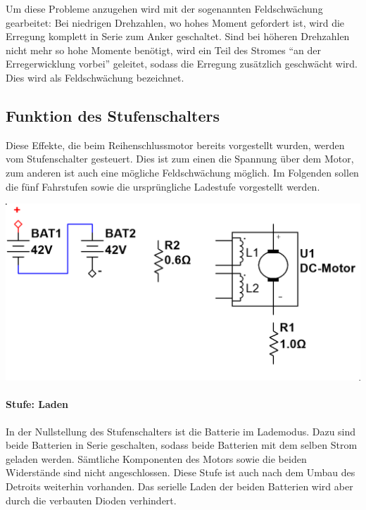 Um diese Probleme anzugehen wird mit der sogenannten Feldschwächung gearbeitet: Bei niedrigen Drehzahlen, wo hohes Moment gefordert ist, wird die Erregung komplett in Serie zum Anker geschaltet. Sind bei höheren Drehzahlen nicht mehr so hohe Momente benötigt, wird ein Teil des Stromes "`an der Erregerwicklung vorbei"' geleitet, sodass die Erregung zusätzlich geschwächt wird. Dies wird als Feldschwächung bezeichnet.

\subsection{Funktion des Stufenschalters}

Diese Effekte, die beim Reihenschlussmotor bereits vorgestellt wurden, werden vom Stufenschalter gesteuert. Dies ist zum einen die Spannung über dem Motor, zum anderen ist auch eine mögliche Feldschwächung möglich. Im Folgenden sollen die fünf Fahrstufen sowie die ursprüngliche Ladestufe vorgestellt werden.

\begin{minipage}{0.49\textwidth}
	\includegraphics[width=\columnwidth]{images/Stufenschalter/Laden.png}%
\end{minipage}
\begin{minipage}{0.5\textwidth}
	\paragraph{Stufe: Laden}
	In der Nullstellung des Stufenschalters ist die Batterie im Lademodus. Dazu sind beide Batterien in Serie geschalten, sodass beide Batterien mit dem selben Strom geladen werden. Sämtliche Komponenten des Motors sowie die beiden Widerstände sind nicht angeschlossen. Diese Stufe ist auch nach dem Umbau des Detroits weiterhin vorhanden. Das serielle Laden der beiden Batterien wird aber durch die verbauten Dioden verhindert.
\end{minipage}

